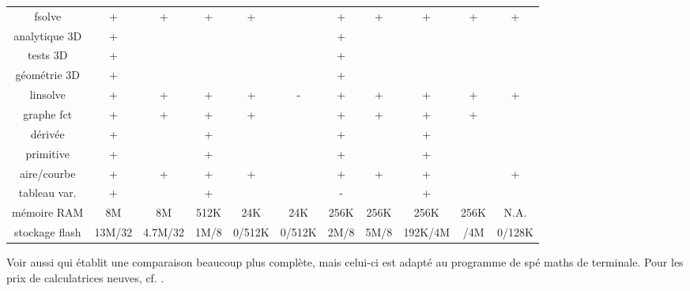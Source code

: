 \documentclass{article}
\begin{document}
\begin{giacjshere}
\begin{center}
\begin{tabular}{|c|c|c|c|c|c|c|c|c|c|c|}
fsolve         &  +       &  +          &  +          &   +         &      &  +           &    +             &  +     &  +   &   + \\ 
analytique 3D &   +       &             &             &             &      &  +           &                  &        &      &    \\ 
tests 3D      &   +       &             &             &             &      &  +           &                  &        &     &    \\ 
géométrie 3D  &   +       &             &             &             &      &  +           &                  &        &     &    \\ 
linsolve      &   +       &  +          & +           &  +          &   -  &  +           &   +              &  +     &   +  &   + \\ 
graphe fct    &   +       &  +          &  +          &   +         &      &  +           &   +              &  +     &   +  &    \\ 
dérivée       &   +       &             &   +         &             &      &  +           &                  &  +     &      &    \\ 
primitive     &   +       &             &   +         &             &      &  +           &                  &  +     &      &    \\ 
aire/courbe   &   +      &  +           &  +          &   +         &      &  +           &   +              &  +     &      &    + \\ 
tableau var.  &  +        &             &   +         &             &      &  -           &                  &  +     &      &    \\ 
mémoire RAM   &  8M      & 8M         & 512K        &  24K          &24K   & 256K         &  256K           & 256K    & 256K & N.A. \\
stockage flash&  13M/32  & 4.7M/32    & 1M/8        &  0/512K       &0/512K& 2M/8        & 5M/8             & 192K/4M & /4M  & 0/128K \\
\end{tabular}
\end{center}
Voir aussi 
qui établit une comparaison beaucoup plus complète, mais celui-ci
est adapté au programme de spé maths de terminale. Pour les prix
de calculatrices neuves, cf. 
.


\end{giacjshere}
\end{document}
